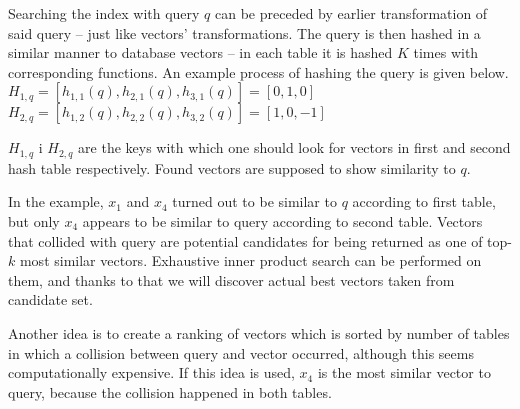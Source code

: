 Searching the index with query $q$ can be preceded by earlier transformation of said query -- just like vectors' transformations.
The query is then hashed in a similar manner to database vectors -- in each table it is hashed $K$ times with corresponding functions.
An example process of hashing the query is given below.\\
$H_{1,q} = [h_{1,1}(q), h_{2,1}(q), h_{3,1}(q)] = [0, 1, 0]$\\
$H_{2,q} = [h_{1,2}(q), h_{2,2}(q), h_{3,2}(q)] = [1, 0, -1]$

$H_{1,q}$ i $H_{2,q}$ are the keys with which one should look for vectors in first and second hash table respectively.
Found vectors are supposed to show similarity to $q$.
\par
In the example, $x_1$ and $x_4$ turned out to be similar to $q$ according to first table, but only $x_4$ appears to be similar to query according to second table.
Vectors that collided with query are potential candidates for being returned as one of top-$k$ most similar vectors.
Exhaustive inner product search can be performed on them, and thanks to that we will discover actual best vectors taken from candidate set.
\par
Another idea is to create a ranking of vectors which is sorted by number of tables in which a collision between query and vector occurred, although this seems computationally expensive.
If this idea is used, $x_4$ is the most similar vector to query, because the collision happened in both tables.
